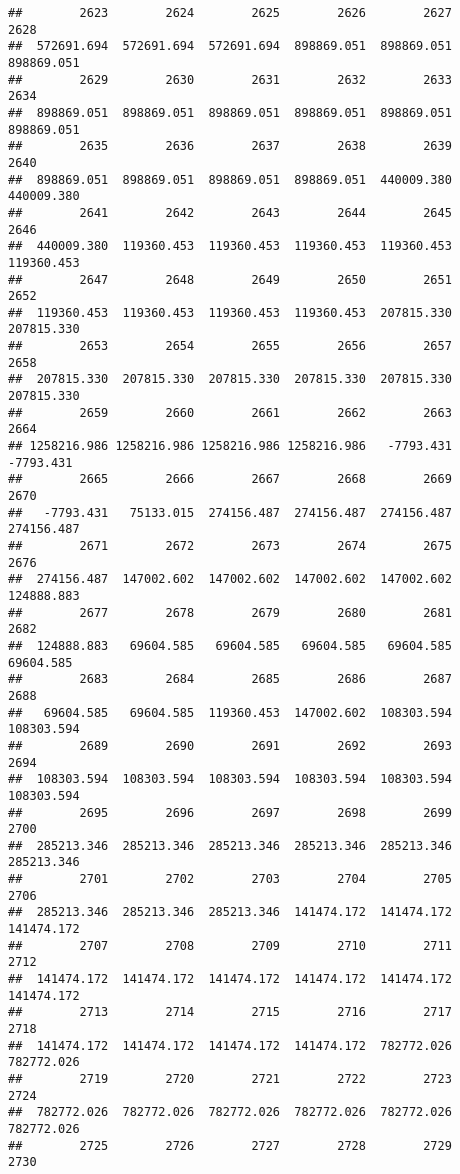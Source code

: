 \documentclass[
]{book}
\begin{document}
\begin{verbatim}
##        2623        2624        2625        2626        2627        2628 
##  572691.694  572691.694  572691.694  898869.051  898869.051  898869.051 
##        2629        2630        2631        2632        2633        2634 
##  898869.051  898869.051  898869.051  898869.051  898869.051  898869.051 
##        2635        2636        2637        2638        2639        2640 
##  898869.051  898869.051  898869.051  898869.051  440009.380  440009.380 
##        2641        2642        2643        2644        2645        2646 
##  440009.380  119360.453  119360.453  119360.453  119360.453  119360.453 
##        2647        2648        2649        2650        2651        2652 
##  119360.453  119360.453  119360.453  119360.453  207815.330  207815.330 
##        2653        2654        2655        2656        2657        2658 
##  207815.330  207815.330  207815.330  207815.330  207815.330  207815.330 
##        2659        2660        2661        2662        2663        2664 
## 1258216.986 1258216.986 1258216.986 1258216.986   -7793.431   -7793.431 
##        2665        2666        2667        2668        2669        2670 
##   -7793.431   75133.015  274156.487  274156.487  274156.487  274156.487 
##        2671        2672        2673        2674        2675        2676 
##  274156.487  147002.602  147002.602  147002.602  147002.602  124888.883 
##        2677        2678        2679        2680        2681        2682 
##  124888.883   69604.585   69604.585   69604.585   69604.585   69604.585 
##        2683        2684        2685        2686        2687        2688 
##   69604.585   69604.585  119360.453  147002.602  108303.594  108303.594 
##        2689        2690        2691        2692        2693        2694 
##  108303.594  108303.594  108303.594  108303.594  108303.594  108303.594 
##        2695        2696        2697        2698        2699        2700 
##  285213.346  285213.346  285213.346  285213.346  285213.346  285213.346 
##        2701        2702        2703        2704        2705        2706 
##  285213.346  285213.346  285213.346  141474.172  141474.172  141474.172 
##        2707        2708        2709        2710        2711        2712 
##  141474.172  141474.172  141474.172  141474.172  141474.172  141474.172 
##        2713        2714        2715        2716        2717        2718 
##  141474.172  141474.172  141474.172  141474.172  782772.026  782772.026 
##        2719        2720        2721        2722        2723        2724 
##  782772.026  782772.026  782772.026  782772.026  782772.026  782772.026 
##        2725        2726        2727        2728        2729        2730 

\end{verbatim}
\end{document}
